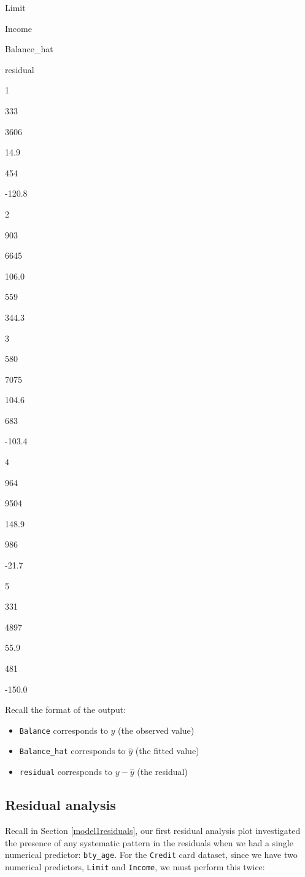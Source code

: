 \documentclass[12pt,]{krantz}
\providecommand{\tightlist}{%
  \setlength{\itemsep}{0pt}\setlength{\parskip}{0pt}}
\begin{document}
Limit

Income

Balance\_hat

residual

1

333

3606

14.9

454

-120.8

2

903

6645

106.0

559

344.3

3

580

7075

104.6

683

-103.4

4

964

9504

148.9

986

-21.7

5

331

4897

55.9

481

-150.0

Recall the format of the output:

\begin{itemize}
\tightlist
\item
  \texttt{Balance} corresponds to \(y\) (the observed value)
\item
  \texttt{Balance\_hat} corresponds to \(\widehat{y}\) (the fitted
  value)
\item
  \texttt{residual} corresponds to \(y - \widehat{y}\) (the residual)
\end{itemize}

\subsection{Residual analysis}\label{model3residuals}

Recall in Section \ref{model1residuals}, our first residual analysis
plot investigated the presence of any systematic pattern in the
residuals when we had a single numerical predictor: \texttt{bty\_age}.
For the \texttt{Credit} card dataset, since we have two numerical
predictors, \texttt{Limit} and \texttt{Income}, we must perform this
twice:
\end{document}
